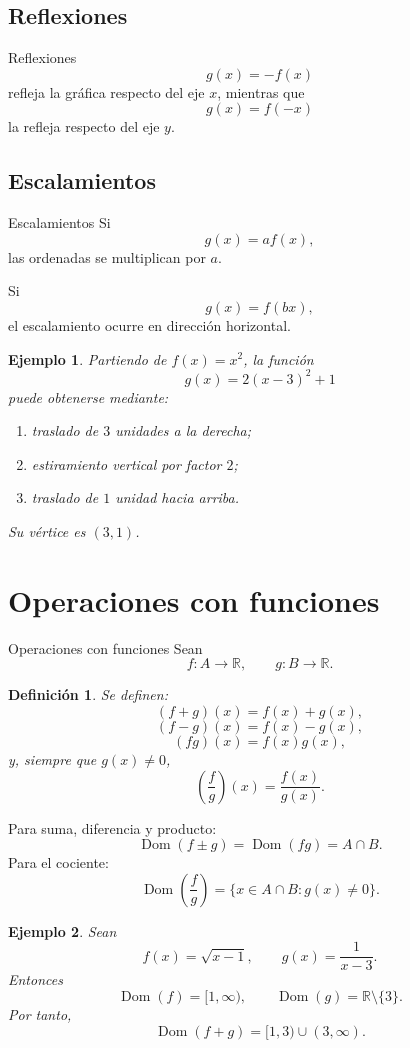 \documentclass[aspectratio=169,10pt]{beamer}
\newtheorem{definicion}{Definición}
\newtheorem{ejemplo}{Ejemplo}
\newcommand{\R}{\mathbb{R}}
\newcommand{\Dom}{\operatorname{Dom}}
\begin{document}
\subsection*{Reflexiones}
\begin{frame}{Reflexiones}
\[
g(x)=-f(x)
\]
refleja la gráfica respecto del eje $x$, mientras que
\[
g(x)=f(-x)
\]
la refleja respecto del eje $y$.
\end{frame}
\subsection*{Escalamientos}
\begin{frame}{Escalamientos}
Si
\[
g(x)=af(x),
\]
las ordenadas se multiplican por $a$.

Si
\[
g(x)=f(bx),
\]
el escalamiento ocurre en dirección horizontal.

\begin{ejemplo}
Partiendo de $f(x)=x^2$, la función
\[
g(x)=2(x-3)^2+1
\]
puede obtenerse mediante:
\begin{enumerate}
    \item traslado de $3$ unidades a la derecha;
    \item estiramiento vertical por factor $2$;
    \item traslado de $1$ unidad hacia arriba.
\end{enumerate}
Su vértice es $(3,1)$.
\end{ejemplo}

\end{frame}
\section{Operaciones con funciones}
\begin{frame}{Operaciones con funciones}
Sean
\[
f:A\to\R,\qquad g:B\to\R.
\]

\begin{definicion}
Se definen:
\[
(f+g)(x)=f(x)+g(x),
\]
\[
(f-g)(x)=f(x)-g(x),
\]
\[
(fg)(x)=f(x)g(x),
\]
y, siempre que $g(x)\neq0$,
\[
\left(\frac{f}{g}\right)(x)=\frac{f(x)}{g(x)}.
\]
\end{definicion}

Para suma, diferencia y producto:
\[
\Dom(f\pm g)=\Dom(fg)=A\cap B.
\]
Para el cociente:
\[
\Dom\left(\frac fg\right)
=\{x\in A\cap B:g(x)\neq0\}.
\]

\begin{ejemplo}
Sean
\[
f(x)=\sqrt{x-1},
\qquad
g(x)=\frac{1}{x-3}.
\]
Entonces
\[
\Dom(f)=[1,\infty),
\qquad
\Dom(g)=\R\setminus\{3\}.
\]
Por tanto,
\[
\Dom(f+g)=[1,3)\cup(3,\infty).
\]
\end{ejemplo}

\end{frame}
\end{document}
